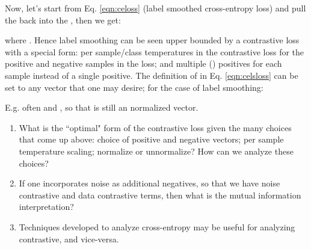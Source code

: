\documentclass[10pt,letterpaper]{article}
\begin{document}
Now, let's start from Eq. \ref{eqn:celoss} (label smoothed cross-entropy loss) and  pull the  back into the , then we get:



where . Hence label smoothing can be seen upper bounded by a contrastive loss with a special form: per sample/class temperatures in the contrastive loss for the positive and negative samples in the loss; and multiple () positives for each sample  instead of a single positive. The definition of  in Eq. \ref{eqn:celsloss} can be set to any vector that one may desire; for the case of label smoothing:



E.g. often  and , so that  is still an \emph{} normalized vector. 

\begin{enumerate}
\item What is the ``optimal" form of the contrastive loss given the many choices that come up above: choice of positive and negative vectors; per sample temperature scaling; normalize or unnormalize? How can we analyze these choices? 

\item If one incorporates noise as additional negatives, so that we have noise contrastive and data contrastive terms, then what is the mutual information interpretation?

\item Techniques developed to analyze cross-entropy may be useful for analyzing contrastive, and vice-versa. 

\end{enumerate}
\end{document}
